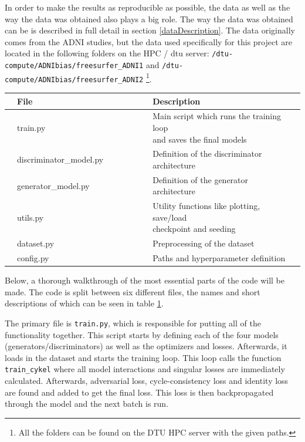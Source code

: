 \documentclass[12pt, fleqn, titlepage]{article}
\begin{document}
In order to make the results as reproducible as possible, the data as well as the way the data was obtained also plays a big role. The way the data was obtained can be is described in full detail in section \ref{dataDescription}. The data originally comes from the ADNI studies, but the data used specifically for this project are located in the following folders on the HPC / dtu server: \texttt{/dtu-compute/ADNIbias/freesurfer\_ADNI1} and \texttt{/dtu-compute/ADNIbias/freesurfer\_ADNI2} \footnote{All the folders can be found on the DTU HPC server with the given paths.}. \\

\begin{table}[H]\label{fig:files}
	\begin{center}
		\begin{tabular}{l l l l l l l l l}
			\toprule
			& \textbf{File}          & & & & & & \textbf{Description}  & \\ \midrule
			& train.py               & & & & & & \makecell[tl]{Main script which runs the training loop \\ and saves the final models} & \\
			& discriminator\_model.py& & & & & & Definition of the discriminator architecture & \\
			& generator\_model.py    & & & & & & Definition of the generator architecture & \\
			& utils.py               & & & & & & \makecell[tl]{Utility functions like plotting, save/load \\ checkpoint and seeding} & \\
			& dataset.py             & & & & & & Preprocessing of the dataset & \\
			& config.py              & & & & & & Paths and hyperparameter definition & \\ \bottomrule
		\end{tabular}
	\end{center}
\end{table}

\noindent Below, a thorough walkthrough of the most essential parts of the code will be made. The code is split between six different files, the names and short descriptions of which can be seen in table \ref{fig:files}. 

The primary file is \texttt{train.py}, which is responsible for putting all of the functionality together. This script starts by defining each of the four models (generators/discriminators) as well as the optimizers and losses. Afterwards, it loads in the dataset and starts the training loop. This loop calls the function \texttt{train\_cykel} where all model interactions and singular losses are immediately calculated. Afterwards, adversarial loss, cycle-consistency loss and identity loss are found and added to get the final loss. This loss is then backpropagated through the model and the next batch is run.
\end{document}
